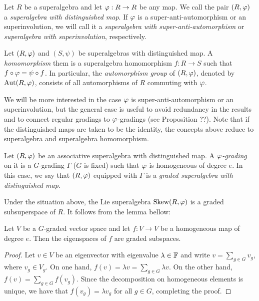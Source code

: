 \documentclass{amsbook}
\begin{document}
\begin{defi}
    Let $R$ be a superalgebra and let $\varphi: R\to R$ be any map. We call the pair $(R, \varphi)$ a \emph{superalgebra with distinguished map}. If $\varphi$ is a super-anti-automorphism or an superinvolution, we will call it a \emph{superalgebra with super-anti-automorphism} or \emph{superalgebra with superinvolution}, respectively.
\end{defi}

\begin{defi}
    Let $(R, \varphi)$ and $(S, \psi)$ be superalgebras with distinguished map. A \emph{homomorphism} them is a superalgebra homomorphism $f: R\to S$ such that $f\circ \varphi = \psi \circ f$. In particular, the \emph{automorphism group} of $(R, \varphi)$, denoted by $\operatorname{Aut}(R, \varphi)$, consists of all automorphisms of $R$ commuting with $\varphi$.
\end{defi}

We will be more interested in the case $\varphi$ is super-anti-automorphism or an superinvolution, but the general case is useful to avoid redundancy in the results and to connect regular gradings to $\varphi$-gradings (see Proposition ??). Note that if the distinguished maps are taken to be the identity, the concepts above reduce to superalgebra and superalgebra homomorphism. 

\begin{defi}
    Let $(R, \varphi)$ be an associative superalgebra with distinguished map. A \emph{$\varphi$-grading} on it is a $G$-grading $\Gamma$ ($G$ is fixed) such that $\varphi$ is homogeneous of degree $e$. In this case, we say that $(R, \varphi)$ equipped with $\Gamma$ is a \emph{graded superalgebra with distinguished map}.
\end{defi}

Under the situation above, the Lie superalgebra $\operatorname{Skew} (R, \varphi)$ is a graded subsuperspace of $R$. It follows from the lemma bellow:

\begin{lemma}
    Let $V$ be a $G$-graded vector space and let $f: V \to V$ be a homogeneous map of degree $e$. Then the eigenspaces of $f$ are graded subspaces.
\end{lemma}

\begin{proof}
    Let $v\in V$ be an eigenvector with eigenvalue $\lambda \in \mathbb{F}$ and write $v = \sum_{g\in G} v_g$, where $v_g \in V_g$. On one hand, $f(v) = \lambda v = \sum_{g\in G} \lambda v$. On the other hand, $f(v) = \sum_{g\in G} f(v_g)$. Since the decomposition on homogeneous elements is unique, we have that $f(v_g) = \lambda v_g$ for all $g\in G$, completing the proof.
\end{proof}
\end{document}
